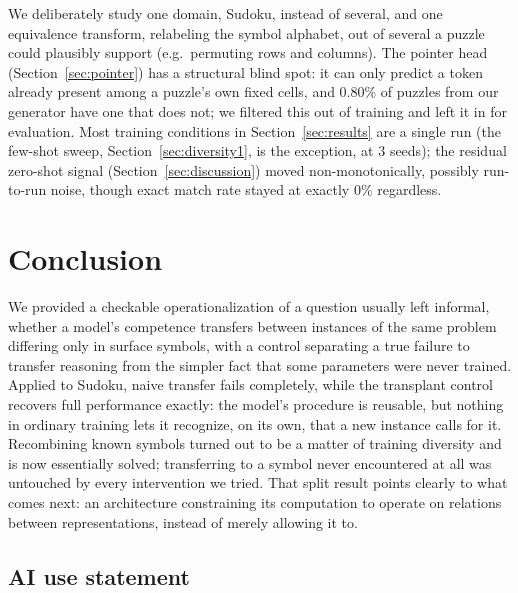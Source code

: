 \documentclass{article} %
\begin{document}
We deliberately study one domain, Sudoku, instead of several, and one
equivalence transform, relabeling the symbol alphabet, out of several a
puzzle could plausibly support (e.g.\ permuting rows and columns). The
pointer head (Section~\ref{sec:pointer}) has a structural blind spot: it
can only predict a token already present among a puzzle's own fixed
cells, and 0.80\% of puzzles from our generator have one that does not;
we filtered this out of training and left it in for evaluation. Most
training conditions in Section~\ref{sec:results} are a single run (the
few-shot sweep, Section~\ref{sec:diversity1}, is the exception, at 3
seeds); the residual zero-shot signal (Section~\ref{sec:discussion})
moved non-monotonically, possibly
run-to-run noise, though exact match rate stayed at exactly 0\%
regardless.

\section{Conclusion}

We provided a checkable operationalization of a question usually left
informal, whether a model's competence transfers between instances of
the same problem differing only in surface symbols, with a control
separating a true failure to transfer reasoning from the simpler fact
that some parameters were never trained. Applied to Sudoku, naive
transfer fails completely, while the transplant control recovers full
performance exactly: the model's procedure is reusable, but nothing in
ordinary training lets it recognize, on its own, that a new instance
calls for it. Recombining known symbols turned out to be a matter of
training diversity and is now essentially solved; transferring to a
symbol never encountered at all was untouched by every intervention we
tried. That split result points clearly to what comes next: an
architecture constraining its computation to operate on relations
between representations, instead of merely allowing it to.

\subsection*{AI use statement}
\end{document}
